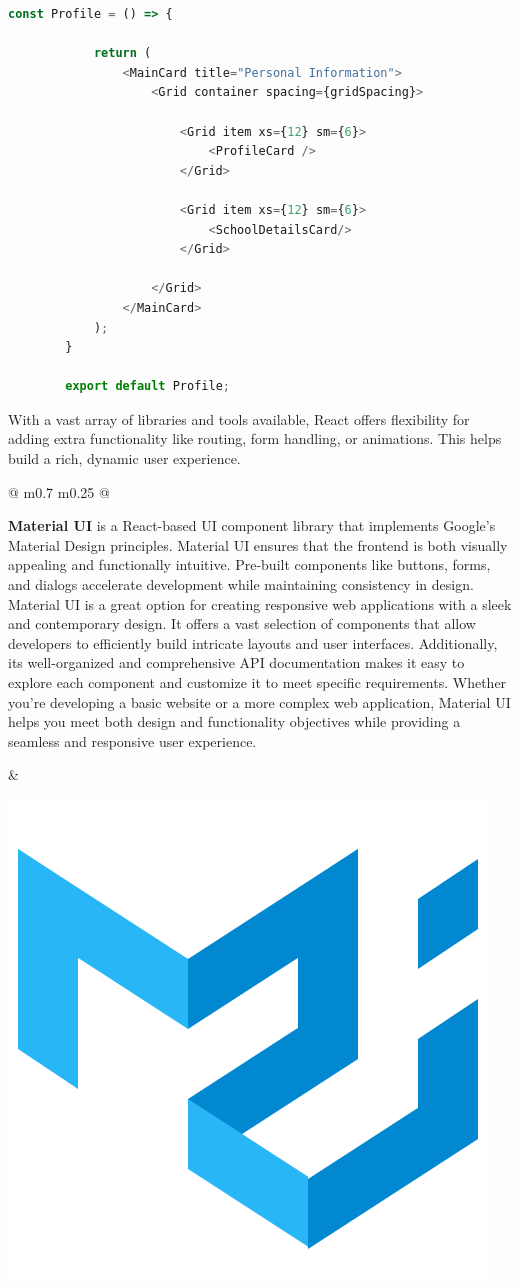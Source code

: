 	\begin{lstlisting}[language=Javascript, caption=Example of a React component]
		const Profile = () => {
			
			return (
				<MainCard title="Personal Information">
					<Grid container spacing={gridSpacing}>
				
						<Grid item xs={12} sm={6}>
							<ProfileCard />
						</Grid>
					
						<Grid item xs={12} sm={6}>
							<SchoolDetailsCard/>
						</Grid>
				
					</Grid>
				</MainCard>
			);
		}
		
		export default Profile;
	\end{lstlisting}
	
	\noindent With a vast array of libraries and tools available, React offers flexibility for adding extra functionality like routing, form handling, or animations. This helps build a rich, dynamic user experience.
	
	 \begin{tabular}{ @{} m{0.7\textwidth} m{0.25\textwidth} @{} }
		\begin{minipage}{\linewidth}
			\textbf{Material UI} is a React-based UI component library that implements Google’s Material Design principles. Material UI ensures that the frontend is both visually appealing and functionally intuitive. Pre-built components like buttons, forms, and dialogs accelerate development while maintaining consistency in design. \cite{material-ui} \\
			
			Material UI is a great option for creating responsive web applications with a sleek and contemporary design. It offers a vast selection of components that allow developers to efficiently build intricate layouts and user interfaces. Additionally, its well-organized and comprehensive API documentation makes it easy to explore each component and customize it to meet specific requirements. Whether you're developing a basic website or a more complex web application, Material UI helps you meet both design and functionality objectives while providing a seamless and responsive user experience. \cite{material-ui-why-use}
		\end{minipage}
		&
		\begin{minipage}{\linewidth}
				\centering
			\includegraphics[width=0.5\linewidth]{graphics/material-ui-480.png}
			\label{fig:material-ui}

		\end{minipage}
	\end{tabular}

